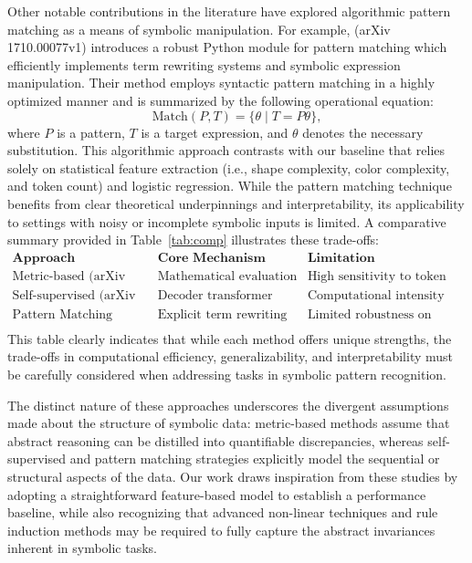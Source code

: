 \documentclass{article}
\begin{document}
Other notable contributions in the literature have explored algorithmic pattern matching as a means of symbolic manipulation. For example, (arXiv 1710.00077v1) introduces a robust Python module for pattern matching which efficiently implements term rewriting systems and symbolic expression manipulation. Their method employs syntactic pattern matching in a highly optimized manner and is summarized by the following operational equation:
\[
\text{Match}(P, T) = \{ \theta \mid T = P\theta \},
\]
where \( P \) is a pattern, \( T \) is a target expression, and \( \theta \) denotes the necessary substitution. This algorithmic approach contrasts with our baseline that relies solely on statistical feature extraction (i.e., shape complexity, color complexity, and token count) and logistic regression. While the pattern matching technique benefits from clear theoretical underpinnings and interpretability, its applicability to settings with noisy or incomplete symbolic inputs is limited. A comparative summary provided in Table~\ref{tab:comp} illustrates these trade-offs:
\[
\begin{array}{l|l|l}
\textbf{Approach} & \textbf{Core Mechanism} & \textbf{Limitation} \\
\hline
\text{Metric-based (arXiv 2505.23833v1)} & \text{Mathematical evaluation of rule adherence} & \text{High sensitivity to token variations} \\
\text{Self-supervised (arXiv 2503.04900v1)} & \text{Decoder transformer with cross-attention} & \text{Computational intensity and tuning complexity} \\
\text{Pattern Matching (arXiv 1710.00077v1)} & \text{Explicit term rewriting and matching} & \text{Limited robustness on noisy data} \\
\end{array}
\]
This table clearly indicates that while each method offers unique strengths, the trade-offs in computational efficiency, generalizability, and interpretability must be carefully considered when addressing tasks in symbolic pattern recognition.

The distinct nature of these approaches underscores the divergent assumptions made about the structure of symbolic data: metric-based methods assume that abstract reasoning can be distilled into quantifiable discrepancies, whereas self-supervised and pattern matching strategies explicitly model the sequential or structural aspects of the data. Our work draws inspiration from these studies by adopting a straightforward feature-based model to establish a performance baseline, while also recognizing that advanced non-linear techniques and rule induction methods may be required to fully capture the abstract invariances inherent in symbolic tasks.
\end{document}
